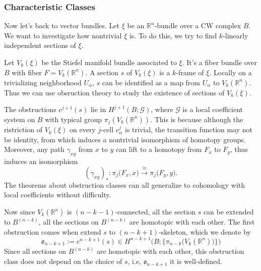 \documentclass[12pt,a4paper]{article}
\theoremstyle{definition}
\newtheorem*{remark}{\noindent Remark}
\newcommand{\mR}{\mathbb{R}}
\begin{document}
\subsubsection*{Characteristic Classes}
Now let's back to vector bundles. Let $\xi$ be an $\mR^n$-bundle over a CW 
complex $B$. We want to investigate how nontrivial $\xi$ is. To do this, we 
try to find $k$-linearly independent sections of $\xi$. 


Let $V_k(\xi)$ be the Stiefel manifold bundle associated to $\xi$. 
It's a fiber bundle over $B$ with fiber $F=V_k(\mR^n)$. A section $s$ of 
$V_k(\xi)$ is a $k$-frame of $\xi$. Locally on a trivializing
neighborhood $U_\alpha$, $s$ can be identified as a map from $U_\alpha$ to
$V_k(\mR^n)$. Thus we can use obsruction theory to study the existence of
sections of $V_k(\xi)$. 

The obstructions $c^{j+1}(s)$ lie in $H^{j+1}(B;\mathcal{G})$, where 
$\mathcal{G}$ is a local coefficient system on $B$ with typical group 
$\pi_j(V_k(\mR^n))$. This is because although the ristriction of $V_k(\xi)$ 
on every $j$-cell $e^j_\alpha$ is trivial, the transition function may not 
be identity, from which induces a nontrivial isomorphism of homotopy groups. 
Moreover, any path $\gamma_{xy}$ from $x$ to $y$ can lift to a homotopy 
from $F_x$ to $F_y$, thus induces an isomorphism 
\begin{equation*}
    (\gamma_{xy})_*:\pi_j\big(F_x,x\big)
    \overset{\cong}{\to}\pi_j\big(F_y,y\big).
\end{equation*}
The theorems about obstruction classes can all generalize to cohomology with 
local coefficients without difficulty. 

Now since $V_k(\mR^n)$ is $(n-k-1)$-connected, all the section $s$ can be 
extended to $B^{(n-k)}$, all the sections on $B^{(n-k)}$ are homotopic with 
each other. The first obstruction comes when extend $s$ to 
$(n-k+1)$-skeleton, which we denote by 
\begin{equation*}
    \mathfrak{o}_{n-k+1}:=c^{n-k+1}(s)\in 
    H^{n-k+1}\Big(B;\big\{\pi_{n-k}\big(V_k(\mR^n)\big)\big\}\Big)
\end{equation*}
Since all sections on $B^{(n-k)}$ are homotopic with each other, this 
obstruction class does not depend on the choice of $s$, i.e, 
$\mathfrak{o}_{n-k+1}$ it is well-defined. 
\end{document}
